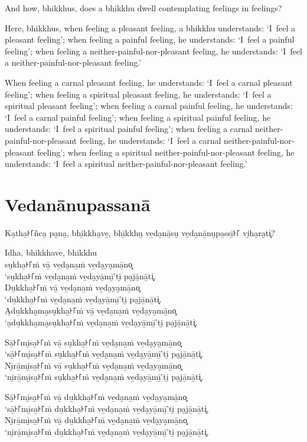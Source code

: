 And how, bhikkhus, does a bhikkhu dwell contemplating feelings in feelings?

Here, bhikkhus, when feeling a pleasant feeling, a bhikkhu understands:
`I~feel a pleasant feeling';
when feeling a painful feeling, he understands:
`I~feel a painful feeling';
when feeling a neither-painful-nor-pleasant feeling, he understands:
`I~feel a neither-painful-nor-pleasant feeling.'

When feeling a carnal pleasant feeling, he understands:
`I~feel a carnal pleasant feeling';
when feeling a spiritual pleasant feeling, he understands:
`I~feel a spiritual pleasant feeling';
when feeling a carnal painful feeling, he understands:
`I~feel a carnal painful feeling';
when feeling a spiritual painful feeling, he understands:
`I~feel a spiritual painful feeling';
when feeling a carnal neither-painful-nor-pleasant feeling, he understands:
`I~feel a carnal neither-painful-nor-pleasant feeling';
when feeling a spiritual neither-painful-nor-pleasant feeling, he understands:
`I~feel a spiritual neither-painful-nor-pleasant feeling.'

\paliPage
\chapter*{Vedanānupassanā}

Ka̮tha̱꜔꜒ñca̮ pa̮na̮, bhi̱kkha̮ve̱, bhi̱kkhu̮ ve̱da̮nā̱su̮ ve̱da̮nā̱nu̮pa̱ssī̱꜔꜒ vi̮ha̮ra̮ti͓?

Idha, bhikkhave, bhikkhu\\
su̮kha̱꜔꜒ṁ vā̱ ve̱da̮na̱ṁ ve̱da̮ya̮mā̱no͓\\
‘su̮kha̱꜔꜒ṁ ve̱da̮na̱ṁ ve̱da̮yā̱mī̱’ti̮ pa̮jā̱nā̱ti͓.\\
Du̱kkha̱꜔꜒ṁ vā̱ ve̱da̮na̱ṁ ve̱da̮ya̮mā̱no͓\\
‘du̱kkha̱꜔꜒ṁ ve̱da̮na̱ṁ ve̱da̮yā̱mī̱’ti̮ pa̮jā̱nā̱ti͓.\\
A̮du̱kkha̮ma̮su̮kha̱꜔꜒ṁ vā̱ ve̱da̮na̱ṁ ve̱da̮ya̮mā̱no͓\\
‘a̮du̱kkha̮ma̮su̮kha̱꜔꜒ṁ ve̱da̮na̱ṁ ve̱da̮yā̱mī̱’ti̮ pa̮jā̱nā̱ti͓.

Sā̱꜔꜒mi̮sa̱꜔꜒ṁ vā̱ su̮kha̱꜔꜒ṁ ve̱da̮na̱ṁ ve̱da̮ya̮mā̱no͓\\
‘sā̱꜔꜒mi̮sa̱꜔꜒ṁ su̮kha̱꜔꜒ṁ ve̱da̮na̱ṁ ve̱da̮yā̱mī̱’ti̮ pa̮jā̱nā̱ti͓.\\
Ni̮rā̱mi̮sa̱꜔꜒ṁ vā̱ su̮kha̱꜔꜒ṁ ve̱da̮na̱ṁ ve̱da̮ya̮mā̱no͓\\
‘ni̮rā̱mi̮sa̱꜔꜒ṁ su̮kha̱꜔꜒ṁ ve̱da̮na̱ṁ ve̱da̮yā̱mī̱’ti̮ pa̮jā̱nā̱ti͓.

Sā̱꜔꜒mi̮sa̱꜔꜒ṁ vā̱ du̱kkha̱꜔꜒ṁ ve̱da̮na̱ṁ ve̱da̮ya̮mā̱no͓\\
‘sā̱꜔꜒mi̮sa̱꜔꜒ṁ du̱kkha̱꜔꜒ṁ ve̱da̮na̱ṁ ve̱da̮yā̱mī̱’ti̮ pa̮jā̱nā̱ti͓.\\
Ni̮rā̱mi̮sa̱꜔꜒ṁ vā̱ du̱kkha̱꜔꜒ṁ ve̱da̮na̱ṁ ve̱da̮ya̮mā̱no͓\\
‘ni̮rā̱mi̮sa̱꜔꜒ṁ du̱kkha̱꜔꜒ṁ ve̱da̮na̱ṁ ve̱da̮yā̱mī̱’ti̮ pa̮jā̱nā̱ti͓.

